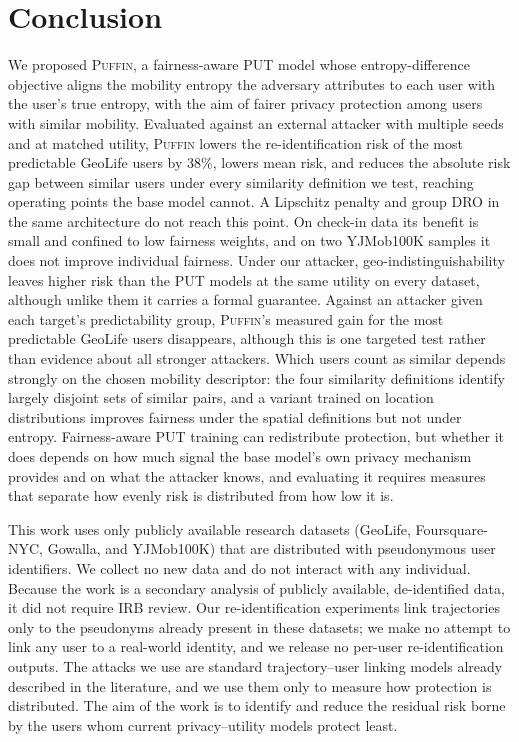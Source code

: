 \documentclass[sigconf,anonymous,review]{acmart}
\newcommand{\puffin}{\textsc{Puffin}}
\begin{document}
\section{Conclusion}
We proposed \puffin, a fairness-aware PUT model whose entropy-difference objective aligns the mobility entropy the adversary attributes to each user with the user's true entropy, with the aim of fairer privacy protection among users with similar mobility. Evaluated against an external attacker with multiple seeds and at matched utility, \puffin{} lowers the re-identification risk of the most predictable GeoLife users by 38\%, lowers mean risk, and reduces the absolute risk gap between similar users under every similarity definition we test, reaching operating points the base model cannot. A Lipschitz penalty and group DRO in the same architecture do not reach this point. On check-in data its benefit is small and confined to low fairness weights, and on two YJMob100K samples it does not improve individual fairness. Under our attacker, geo-indistinguishability leaves higher risk than the PUT models at the same utility on every dataset, although unlike them it carries a formal guarantee. Against an attacker given each target's predictability group, \puffin's measured gain for the most predictable GeoLife users disappears, although this is one targeted test rather than evidence about all stronger attackers. Which users count as similar depends strongly on the chosen mobility descriptor: the four similarity definitions identify largely disjoint sets of similar pairs, and a variant trained on location distributions improves fairness under the spatial definitions but not under entropy. Fairness-aware PUT training can redistribute protection, but whether it does depends on how much signal the base model's own privacy mechanism provides and on what the attacker knows, and evaluating it requires measures that separate how evenly risk is distributed from how low it is.


\appendix

\begin{ethics}
This work uses only publicly available research datasets (GeoLife, Foursquare-NYC, Gowalla, and YJMob100K) that are distributed with pseudonymous user identifiers. We collect no new data and do not interact with any individual. Because the work is a secondary analysis of publicly available, de-identified data, it did not require IRB review. Our re-identification experiments link trajectories only to the pseudonyms already present in these datasets; we make no attempt to link any user to a real-world identity, and we release no per-user re-identification outputs. The attacks we use are standard trajectory--user linking models already described in the literature, and we use them only to measure how protection is distributed. The aim of the work is to identify and reduce the residual risk borne by the users whom current privacy--utility models protect least.
\end{ethics}
\end{document}
